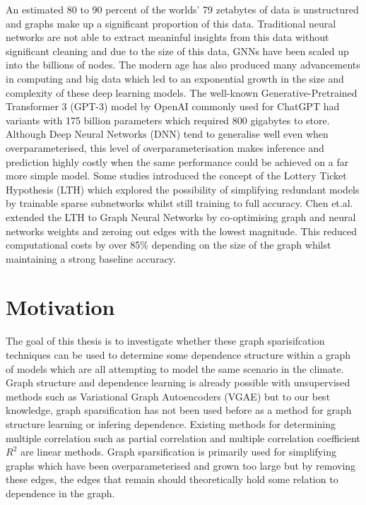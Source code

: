 \documentclass[honours,12pt]{unswthesis}
\numberwithin{equation}{section}
\begin{document}
An estimated 80 to 90 percent of the worlds' 79 zetabytes of data is unstructured and graphs make up a significant proportion of this data\cite{inmon2007tapping}.
Traditional neural networks are not able to extract meaninful insights from this data without significant cleaning and due to the size of this data, GNNs have been scaled up into the billions of nodes.
The modern age has also produced many advancements in computing and big data which led to an exponential growth in the size and complexity of these deep learning models.
The well-known Generative-Pretrained Transformer 3 (GPT-3) model by OpenAI commonly used for ChatGPT had variants with 175 billion parameters which required 800 gigabytes to store.\cite{radford2018improving}
Although Deep Neural Networks (DNN) tend to generalise well even when overparameterised\cite{Cao_Gu_2020}, this level of overparameterisation makes inference 
and prediction highly costly when the same performance could be achieved on a far more simple model. Some studies introduced the concept of the
Lottery Ticket Hypothesis (LTH)\cite{frankle2020linear} which explored the possibility of simplifying redundant models by trainable sparse subnetworks whilst still training to full accuracy.
Chen et.al.\cite{chen2021unified} extended the LTH to Graph Neural Networks by co-optimising graph and neural networks weights and zeroing out edges with the lowest magnitude. 
This reduced computational costs by over 85\% depending on the size of the graph whilst maintaining a strong baseline accuracy.

{\section{Motivation}}\label{motivation}

The goal of this thesis is to investigate whether these graph sparisifcation techniques can be used to determine some dependence structure within a graph of models which
are all attempting to model the same scenario in the climate. Graph structure and dependence learning is already possible with unsupervised methods such as Variational Graph Autoencoders (VGAE)\cite{pmlr-v97-yu19a}
but to our best knowledge, graph sparsification has not been used before as a method for graph structure learning or infering dependence. Existing methods for determining multiple correlation such as 
partial correlation and multiple correlation coefficient $R^2$ are linear methods. Graph sparsification is primarily used for simplifying graphs which have been overparameterised and grown too large but 
by removing these edges, the edges that remain should theoretically hold some relation to dependence in the graph. 
\end{document}
